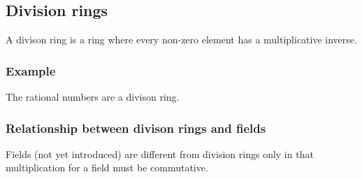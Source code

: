 
\subsection{Division rings}

A divison ring is a ring where every non-zero element has a multiplicative inverse.

\subsubsection{Example}

The rational numbers are a divison ring.

\subsubsection{Relationship between divison rings and fields}

Fields (not yet introduced) are different from division rings only in that multiplication for a field must be commutative.


